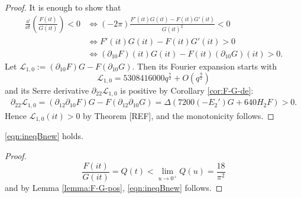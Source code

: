 \begin{proof}
It is enough to show that
\begin{align}
    \frac{\dd}{\dd t} \left(\frac{F(it)}{G(it)}\right) < 0 &\Leftrightarrow (- 2\pi) \frac{F'(it)G(it) - F(it) G'(it)}{G(it)^{2}} < 0 \\
    &\Leftrightarrow F'(it) G(it) - F(it) G'(it) > 0 \\
    &\Leftrightarrow (\partial_{10}F)(it) G(it) - F(it) (\partial_{10}G)(it) > 0.
\end{align}
Let $\mathcal{L}_{1, 0} := (\partial_{10}F) G - F (\partial_{10} G)$.
Then its Fourier expansion starts with
\[
    \mathcal{L}_{1, 0} = 5308416000 q^{\frac{7}{2}} + O(q^{\frac{9}{2}})
\]
and its Serre derivative $\partial_{22} \mathcal{L}_{1, 0}$ is positive by Corollary \ref{cor:F-G-de}:
\begin{align}
    \partial_{22} \mathcal{L}_{1, 0} = (\partial_{12} \partial_{10} F) G - F (\partial_{12}\partial_{10} G)
    = \Delta (7200 (-E_{2}') G + 640 H_2 F) > 0.
\end{align}
Hence $\mathcal{L}_{1, 0}(it) > 0$ by Theorem [REF], and the monotonicity follows.
\end{proof}


\begin{corollary}\label{cor:ineqBnew} 
\eqref{eqn:ineqBnew} holds.
\end{corollary}
\begin{proof}
\begin{equation}
  \frac{F(it)}{G(it)} = Q(t) < \lim_{u \to 0^+} Q(u) = \frac{18}{\pi^2}
\end{equation}
and by Lemma \ref{lemma:F-G-pos}, \eqref{eqn:ineqBnew} follows.
\end{proof}



